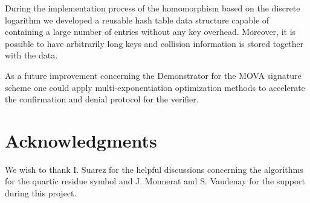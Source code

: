 \documentclass[a4paper, 11pt]{article}
\begin{document}
 During the implementation process of the homomorphism based on the discrete logarithm we developed a reusable hash table data structure capable of containing a large number of entries without any key overhead. Moreover, it is possible to have arbitrarily long keys and collision information is stored together with the data. 
 
 As a future improvement concerning the Demonstrator for the MOVA signature scheme one could apply multi-exponentiation optimization methods to accelerate the confirmation and denial protocol for the verifier. 
 
 
 \section{Acknowledgments} 
 We wish to thank I. Suarez for the helpful discussions concerning the algorithms for the quartic residue symbol and J. Monnerat and S. Vaudenay for the support during this project.
\end{document}
